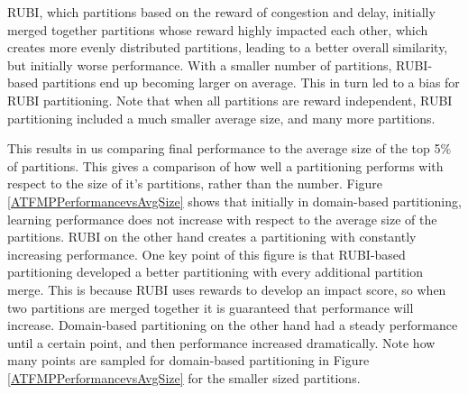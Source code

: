 \documentclass[letterpaper]{article}
\begin{document}
RUBI, which partitions based on the reward of congestion and delay, initially merged together partitions whose reward highly impacted each other, which creates more evenly distributed partitions, leading to a better overall similarity, but initially worse performance. With a smaller number of partitions, RUBI-based partitions end up becoming larger on average. This in turn led to a bias for RUBI partitioning. Note that when all partitions are reward independent, RUBI partitioning included a much smaller average size, and many more partitions.

This results in us comparing final performance to the average size of the top 5\% of partitions. This gives a comparison of how well a partitioning performs with respect to the size of it's partitions, rather than the number. Figure \ref{ATFMPPerformancevsAvgSize} shows that initially in domain-based partitioning, learning performance does not increase with respect to the average size of the partitions. RUBI on the other hand creates a partitioning with constantly increasing performance. One key point of this figure is that RUBI-based partitioning developed a better partitioning with every additional partition merge. This is because RUBI uses rewards to develop an impact score, so when two partitions are merged together it is guaranteed that performance will increase. Domain-based partitioning on the other hand had a steady performance until a certain point, and then performance increased dramatically. Note how many points are sampled for domain-based partitioning in Figure \ref{ATFMPPerformancevsAvgSize} for the smaller sized partitions.

\end{document}
